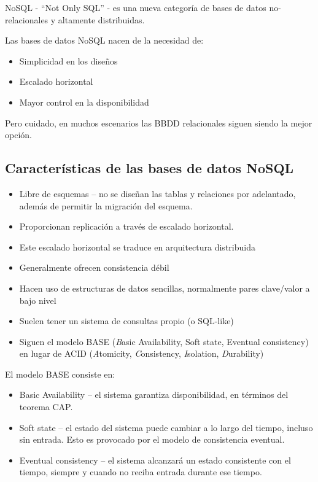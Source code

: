 \documentclass[
]{book}
\providecommand{\tightlist}{%
  \setlength{\itemsep}{0pt}\setlength{\parskip}{0pt}}
\begin{document}
NoSQL - ``Not Only SQL'' - es una nueva categoría de bases de datos no-relacionales y altamente distribuidas.

Las bases de datos NoSQL nacen de la necesidad de:

\begin{itemize}
\item
  Simplicidad en los diseños
\item
  Escalado horizontal
\item
  Mayor control en la disponibilidad
\end{itemize}

Pero cuidado, en muchos escenarios las BBDD relacionales siguen siendo la mejor opción.

\subsection{Características de las bases de datos NoSQL}\label{caracteruxedsticas-de-las-bases-de-datos-nosql}

\begin{itemize}
\tightlist
\item
  Libre de esquemas -- no se diseñan las tablas y relaciones por adelantado, además de permitir la migración del esquema.
\item
  Proporcionan replicación a través de escalado horizontal.
\item
  Este escalado horizontal se traduce en arquitectura distribuida
\item
  Generalmente ofrecen consistencia débil
\item
  Hacen uso de estructuras de datos sencillas, normalmente pares clave/valor a bajo nivel
\item
  Suelen tener un sistema de consultas propio (o SQL-like)
\item
  Siguen el modelo BASE (\emph{B}asic Availability, Soft state, Eventual consistency) en lugar de ACID (\emph{A}tomicity, \emph{C}onsistency, \emph{I}solation, \emph{D}urability)
\end{itemize}

El modelo BASE consiste en:

\begin{itemize}
\tightlist
\item
  Basic Availability -- el sistema garantiza disponibilidad, en términos del teorema CAP.
\item
  Soft state -- el estado del sistema puede cambiar a lo largo del tiempo, incluso sin entrada. Esto es provocado por el modelo de consistencia eventual.
\item
  Eventual consistency -- el sistema alcanzará un estado consistente con el tiempo, siempre y cuando no reciba entrada durante ese tiempo.
\end{itemize}
\end{document}
